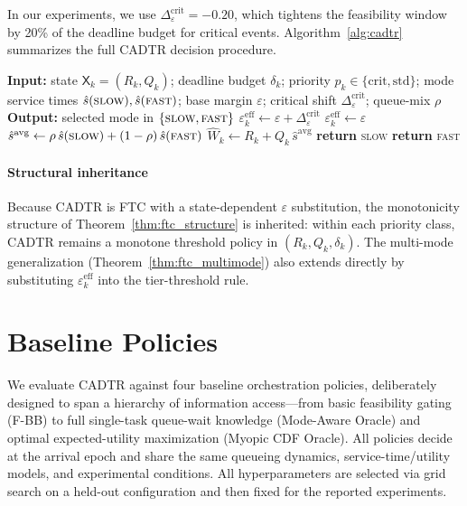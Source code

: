 \documentclass[preprint,12pt]{elsarticle}
\begin{document}
In our experiments, we use $\Delta_{\varepsilon}^{\mathrm{crit}} = -0.20$, which tightens the feasibility window by 20\% of the deadline budget for critical events. Algorithm~\ref{alg:cadtr} summarizes the full CADTR decision procedure.

\begin{algorithm}[t]
\caption{CADTR (Context-Aware Dynamic Tool Resolution) at request arrival.}
\label{alg:cadtr}
\begin{algorithmic}[1]
\STATE \textbf{Input:} state $\mathsf{X}_k=(R_k,Q_k)$; deadline budget $\delta_k$; priority $p_k \in \{\text{crit}, \text{std}\}$; mode service times $\hat{s}(\textsc{slow}), \hat{s}(\textsc{fast})$; base margin $\varepsilon$; critical shift $\Delta_{\varepsilon}^{\mathrm{crit}}$; queue-mix $\rho$
\STATE \textbf{Output:} selected mode in $\{\textsc{slow},\textsc{fast}\}$
    \STATE $\varepsilon_k^{\mathrm{eff}} \gets \varepsilon + \Delta_{\varepsilon}^{\mathrm{crit}}$
\ELSE
    \STATE $\varepsilon_k^{\mathrm{eff}} \gets \varepsilon$
\ENDIF
\STATE $\hat{s}^{\mathrm{avg}} \gets \rho\,\hat{s}(\textsc{slow}) + (1-\rho)\,\hat{s}(\textsc{fast})$
\STATE $\widehat{W}_k \gets R_k + Q_k\,\hat{s}^{\mathrm{avg}}$
    \STATE \textbf{return} \textsc{slow} 
\ELSE
    \STATE \textbf{return} \textsc{fast} 
\ENDIF
\end{algorithmic}
\end{algorithm}

\paragraph{Structural inheritance}
Because CADTR is FTC with a state-dependent $\varepsilon$ substitution, the monotonicity structure of Theorem~\ref{thm:ftc_structure} is inherited: within each priority class, CADTR remains a monotone threshold policy in $(R_k, Q_k, \delta_k)$. The multi-mode generalization (Theorem~\ref{thm:ftc_multimode}) also extends directly by substituting $\varepsilon_k^{\mathrm{eff}}$ into the tier-threshold rule.


\section{Baseline Policies}
\label{sec:baselines}

We evaluate CADTR against four baseline orchestration policies, deliberately designed to span a hierarchy of information access---from basic feasibility gating (F-BB) to full single-task queue-wait knowledge (Mode-Aware Oracle) and optimal expected-utility maximization (Myopic CDF Oracle). All policies decide at the arrival epoch and share the same queueing dynamics, service-time/utility models, and experimental conditions. All hyperparameters are selected via grid search on a held-out configuration and then fixed for the reported experiments.
\end{document}

